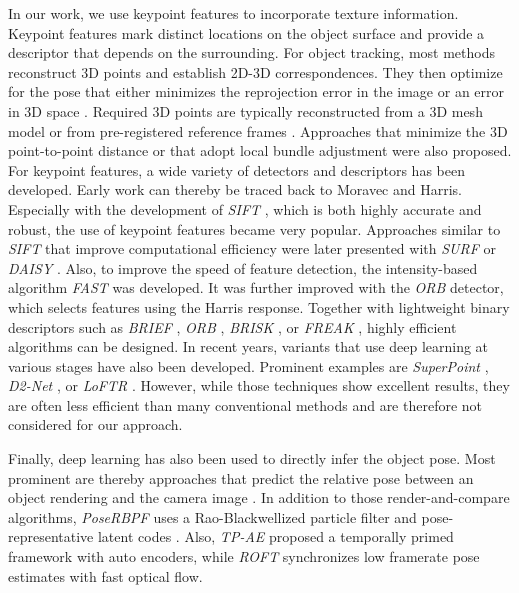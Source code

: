 \documentclass[letterpaper, 10 pt, conference]{ieeeconf}
\begin{document}
In our work, we use keypoint features to incorporate texture information.
Keypoint features mark distinct locations on the object surface and provide a descriptor that depends on the surrounding.
For object tracking, most methods reconstruct 3D points and establish 2D-3D correspondences.
They then optimize for the pose that either minimizes the reprojection error in the image \cite{Vacchetti2004, Lourakis2013} or an error in 3D space \cite{Brox2010}.
Required 3D points are typically reconstructed from a 3D mesh model \cite{Brox2010} or from pre-registered reference frames \cite{Vacchetti2004, Lourakis2013}.
Approaches that minimize the 3D point-to-point distance \cite{Krainin2011} or that adopt local bundle adjustment \cite{Vacchetti2004} were also proposed.
For keypoint features, a wide variety of detectors and descriptors has been developed.
Early work can thereby be traced back to Moravec and Harris.
Especially with the development of \textit{SIFT} \cite{Lowe2004}, which is both highly accurate and robust, the use of keypoint features became very popular.
Approaches similar to \textit{SIFT} that improve computational efficiency were later presented with  \textit{SURF} \cite{Bay2006} or \textit{DAISY} \cite{Tola2010}.
Also, to improve the speed of feature detection, the intensity-based algorithm \textit{FAST} \cite{Rosten2005} was developed.
It was further improved with the \textit{ORB} \cite{Rublee2011} detector, which selects features using the Harris response.
Together with lightweight binary descriptors such as \textit{BRIEF} \cite{Calonder2010}, \textit{ORB} \cite{Rublee2011}, \textit{BRISK} \cite{Leutenegger2011}, or \textit{FREAK} \cite{Alahi2012}, highly efficient algorithms can be designed.
In recent years, variants that use deep learning at various stages have also been developed.
Prominent examples are \textit{SuperPoint} \cite{DeTone2018}, \textit{D2-Net} \cite{Dusmanu2019}, or \textit{LoFTR} \cite{Sun2021b}.
However, while those techniques show excellent results, they are often less efficient than many conventional methods and are therefore not considered for our approach.

Finally, deep learning has also been used to directly infer the object pose.
Most prominent are thereby approaches that predict the relative pose between an object rendering and the camera image \cite{Manhardt2018,Li2018,Wen2020}.
In addition to those render-and-compare algorithms, \textit{PoseRBPF} \cite{Deng2021} uses a Rao-Blackwellized particle filter and pose-representative latent codes \cite{Sundermeyer2018}.
Also, \textit{TP-AE} \cite{Zheng2022} proposed a temporally primed framework with auto encoders, while \textit{ROFT} \cite{Piga2022} synchronizes low framerate pose estimates with fast optical flow.
 
\end{document}
